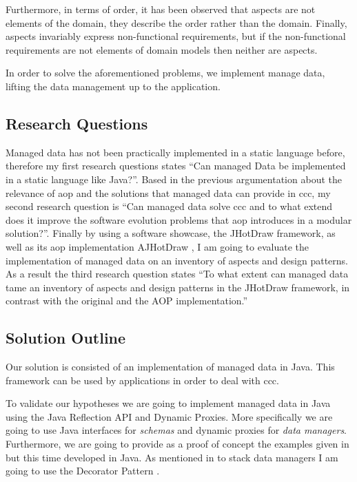 Furthermore, in terms of order, it has been observed that aspects are not elements of the domain, they describe the order rather than the domain. 
Finally, aspects invariably express non-functional requirements, but if the non-functional requirements are not elements of domain models then neither are aspects.

In order to solve the aforementioned problems, we implement manage data, lifting the data management up to the application.

\subsection{Research Questions}\label{Research Questions}
Managed data has not been practically implemented in a static language before, therefore my first research questions states 
``Can managed Data be implemented in a static language like Java?''. 
Based in the previous argumentation about the relevance of \ac{aop} and the solutions that managed data can provide in \ac{ccc}, my second research question is ``Can managed data solve \ac{ccc} and to what extend does it improve the software evolution problems that \ac{aop} introduces in a modular solution?''. 
Finally by using a software showcase, the JHotDraw framework, as well as its \ac{aop} implementation AJHotDraw \cite{marinajhotdraw}, 
I am going to evaluate the implementation of managed data on an inventory of aspects and design patterns. 
As a result the third research question states ``To what extent can managed data tame an inventory of aspects and design patterns in the JHotDraw framework, in contrast with the original and the AOP implementation.''

\subsection{Solution Outline}\label{Solution Outline}
Our solution is consisted of an implementation of managed data in Java. 
This framework can be used by applications in order to deal with \ac{ccc}.

To validate our hypotheses we are going to implement managed data in Java using the Java Reflection API and Dynamic Proxies. 
More specifically we are going to use Java interfaces for \textit{schemas} and dynamic proxies for \textit{data managers}. 
Furthermore, we are going to provide as a proof of concept the examples given in \cite{loh2012managed} but this time developed in Java. As mentioned in \cite{loh2012managed} to stack data managers I am going to use the Decorator Pattern \cite{gamma1995design}. 

